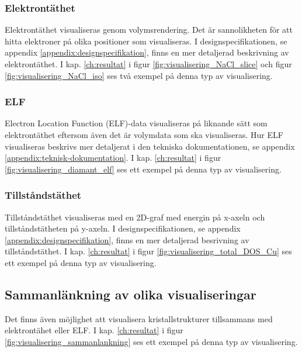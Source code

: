 \documentclass[a4paper,12pt]{article}
\begin{document}
\subsubsection{Elektrontäthet}
Elektrontäthet visualiseras genom volymsrendering. Det är sannolikheten för att hitta elektroner på olika positioner som visualiseras. %
I designspecifikationen, se appendix \ref{appendix:designspecifikation}, finns en mer detaljerad beskrivning av elektrontäthet. I kap. \ref{ch:resultat} i figur \ref{fig:visualisering_NaCl_slice} och figur \ref{fig:visualisering_NaCl_iso} ses två exempel på denna typ av visualisering.

\subsubsection{ELF}
Electron Location Function (ELF)-data visualiseras på liknande sätt som elektrontäthet eftersom även det är volymdata som ska visualiseras. Hur ELF visualiseras beskrivs mer detaljerat i den tekniska dokumentationen, se appendix \ref{appendix:teknisk-dokumentation}. I kap. \ref{ch:resultat} i figur \ref{fig:visualisering_diamant_elf} ses ett exempel på denna typ av visualisering.

\subsubsection{Tillståndstäthet}
Tillståndstäthet visualiseras med en 2D-graf med energin på x-axeln och tillståndstätheten på y-axeln.  %
I designspecifikationen, se appendix \ref{appendix:designspecifikation}, finns en mer detaljerad besrivning av tillståndstäthet. I kap. \ref{ch:resultat} i figur \ref{fig:visualisering_total_DOS_Cu} ses ett exempel på denna typ av visualisering.

\subsection{Sammanlänkning av olika visualiseringar}
Det finns även möjlighet att visualisera kristallstrukturer tillsammans med elektrontähet eller ELF. I kap. \ref{ch:resultat} i figur \ref{fig:visualisering_sammanlankning} ses ett exempel på denna typ av visualisering.


\end{document}

